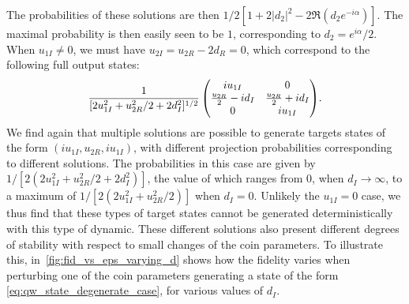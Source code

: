 The probabilities of these solutions are then
$1/2[1 + 2\lvert d_2\rvert^2 - 2\Re(d_2e^{-i\alpha})]$.
The maximal probability is then easily seen to be $1$, corresponding to $d_2=e^{i\alpha}/2$.
When $u_{1I}\neq0$, we must have $u_{2I}=u_{2R}-2d_R=0$, which correspond to the following full output states:
\begin{equation}
	\scalemath{0.96}{
    \frac{1}{[2u_{1I}^2 + u_{2R}^2/2 + 2 d_I^2]^{1/2}}
	\begin{pmatrix}
		i u_{1I} & 0 \\
		\frac{u_{2R}}{2}-i d_I & \frac{u_{2R}}{2} + i d_I \\
		0 & i u_{1I}
	\end{pmatrix}}.
	\label{eq:qw_state_degenerate_case}
\end{equation}
We find again that multiple solutions are possible to generate targets states of the form
$(iu_{1I},u_{2R},i u_{1I})$,
with different projection probabilities corresponding to different solutions.
The probabilities in this case are given by
$1/[2\left( 2 u_{1I}^2 + u_{2R}^2/2 + 2 d_I^2 \right)]$,
the value of which ranges from 0, when $d_I \to \infty$, to a maximum of
$1/[2(2u_{1I}^2 + u_{2R}^2 / 2)]$ when $d_I = 0$.
Unlikely the $u_{1I}=0$ case, we thus find that these types of target states cannot be generated deterministically with this type of dynamic.
These different solutions also present different degrees of stability with respect to small changes of the coin parameters.
To illustrate this, in~\cref{fig:fid_vs_eps_varying_d} shows how the fidelity varies when perturbing one of the coin parameters generating a state of the form \cref{eq:qw_state_degenerate_case}, for various values of $d_I$.

